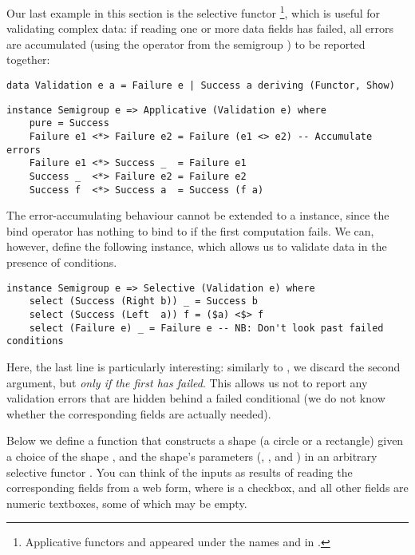 {Our last example in this section is the selective functor
\footnote{Applicative functors  and 
appeared under the names  and  in
\citep{mcbride2008applicative}.}, which is useful for validating complex data:
if reading one or more data fields has failed, all errors are accumulated (using
the operator \hs{<>} from the semigroup ) to be reported together:

\vspace{1mm}
\begin{verbatim}
data Validation e a = Failure e | Success a deriving (Functor, Show)
\end{verbatim}
\vspace{1mm}
\begin{verbatim}
instance Semigroup e => Applicative (Validation e) where
    pure = Success
    Failure e1 <*> Failure e2 = Failure (e1 <> e2) -- Accumulate errors
    Failure e1 <*> Success _  = Failure e1
    Success _  <*> Failure e2 = Failure e2
    Success f  <*> Success a  = Success (f a)
\end{verbatim}
\vspace{1mm}

\noindent
The error-accumulating behaviour cannot be extended to a  instance,
since the bind operator has nothing to bind to if the first computation fails.
We can, however, define the following  instance, which allows us
to validate data in the presence of conditions.

\vspace{1mm}
\begin{verbatim}
instance Semigroup e => Selective (Validation e) where
    select (Success (Right b)) _ = Success b
    select (Success (Left  a)) f = ($a) <$> f
    select (Failure e) _ = Failure e -- NB: Don't look past failed conditions
\end{verbatim}
\vspace{1mm}

\noindent
Here, the last line is particularly interesting: similarly to , we
discard the second argument, but \emph{only if the first has failed}. This
allows us not to report any validation errors that are hidden behind a failed
conditional (we do not know whether the corresponding fields are actually
needed).

Below we define a function that constructs a shape (a circle or a rectangle)
given a choice of the shape , and the shape's parameters (, ,
and ) in an arbitrary selective functor . You can think of the
inputs as results of reading the corresponding fields from a web form, where
 is a checkbox, and all other fields are numeric textboxes, some of which
may be empty.

}
